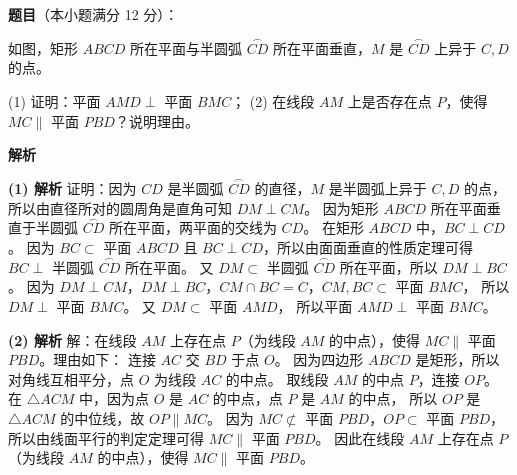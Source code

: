 \begin{answer}

\textbf{题目}（本小题满分 12 分）：

如图，矩形 $ABCD$ 所在平面与半圆弧 $\overset{\frown}{CD}$ 所在平面垂直，$M$ 是 $\overset{\frown}{CD}$ 上异于 $C, D$ 的点。
\nopagebreak[4]
\begin{center}\end{center}
\nopagebreak[4]
(1) 证明：平面 $AMD \perp$ 平面 $BMC$；
(2) 在线段 $AM$ 上是否存在点 $P$，使得 $MC \parallel$ 平面 $PBD$？说明理由。

\textbf{解析}

\textbf{(1) 解析} 证明：因为 $CD$ 是半圆弧 $\overset{\frown}{CD}$ 的直径，$M$ 是半圆弧上异于 $C, D$ 的点，
所以由直径所对的圆周角是直角可知 $DM \perp CM$。
因为矩形 $ABCD$ 所在平面垂直于半圆弧 $\overset{\frown}{CD}$ 所在平面，两平面的交线为 $CD$。
在矩形 $ABCD$ 中，$BC \perp CD$。
因为 $BC \subset$ 平面 $ABCD$ 且 $BC \perp CD$，所以由面面垂直的性质定理可得 $BC \perp$ 半圆弧 $\overset{\frown}{CD}$ 所在平面。
又 $DM \subset$ 半圆弧 $\overset{\frown}{CD}$ 所在平面，所以 $DM \perp BC$。
因为 $DM \perp CM$，$DM \perp BC$，$CM \cap BC = C$，$CM, BC \subset$ 平面 $BMC$，
所以 $DM \perp$ 平面 $BMC$。
又 $DM \subset$ 平面 $AMD$，
所以平面 $AMD \perp$ 平面 $BMC$。

\textbf{(2) 解析} 解：在线段 $AM$ 上存在点 $P$（为线段 $AM$ 的中点），使得 $MC \parallel$ 平面 $PBD$。理由如下：
连接 $AC$ 交 $BD$ 于点 $O$。
因为四边形 $ABCD$ 是矩形，所以对角线互相平分，点 $O$ 为线段 $AC$ 的中点。
取线段 $AM$ 的中点 $P$，连接 $OP$。
在 $\triangle ACM$ 中，因为点 $O$ 是 $AC$ 的中点，点 $P$ 是 $AM$ 的中点，
所以 $OP$ 是 $\triangle ACM$ 的中位线，故 $OP \parallel MC$。
因为 $MC \not\subset$ 平面 $PBD$，$OP \subset$ 平面 $PBD$，
所以由线面平行的判定定理可得 $MC \parallel$ 平面 $PBD$。
因此在线段 $AM$ 上存在点 $P$（为线段 $AM$ 的中点），使得 $MC \parallel$ 平面 $PBD$。



\end{answer}

